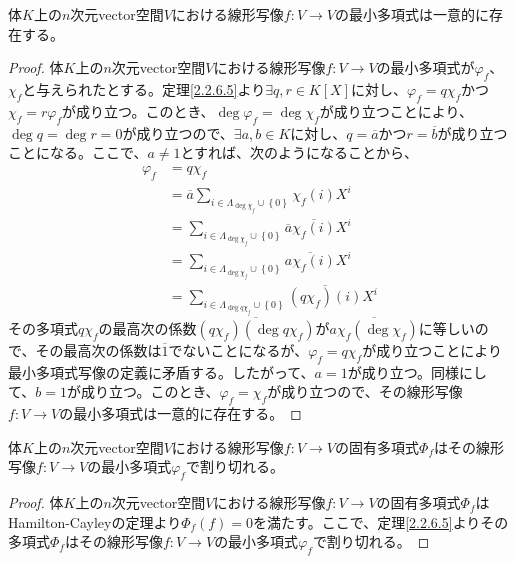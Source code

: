\documentclass[dvipdfmx]{jsarticle}
\begin{document}
\begin{thm}\label{2.2.6.6}
体$K$上の$n$次元vector空間$V$における線形写像$f:V \rightarrow V$の最小多項式は一意的に存在する。
\end{thm}
\begin{proof}
体$K$上の$n$次元vector空間$V$における線形写像$f:V \rightarrow V$の最小多項式が$\varphi_{f}$、$\chi_{f}$と与えられたとする。定理\ref{2.2.6.5}より$\exists q,r \in K[ X]$に対し、$\varphi_{f} = q\chi_{f}$かつ$\chi_{f} = r\varphi_{f}$が成り立つ。このとき、$\deg{\varphi_{f}} = \deg{\chi_{f}}$が成り立つことにより、$\deg{q} = \deg{r} = 0$が成り立つので、$\exists a,b \in K$に対し、$q = \overline{a}$かつ$r = \overline{b}$が成り立つことになる。ここで、$a \neq 1$とすれば、次のようになることから、
\begin{align*}
\varphi_{f} &= q\chi_{f}\\
&= \overline{a}\sum_{i \in \varLambda_{\deg{\chi_{f}}} \cup \left\{ 0 \right\}} {\chi_{f}(i)X^{i}}\\
&= \sum_{i \in \varLambda_{\deg{\chi_{f}}} \cup \left\{ 0 \right\}} {\overline{a}\overline{\chi_{f}(i)}X^{i}}\\
&= \sum_{i \in \varLambda_{\deg{\chi_{f}}} \cup \left\{ 0 \right\}} {\overline{a\chi_{f}(i)}X^{i}}\\
&= \sum_{i \in \varLambda_{\deg{q\chi_{f}}} \cup \left\{ 0 \right\}} {\overline{\left( q\chi_{f} \right)(i)}X^{i}}
\end{align*}
その多項式$q\chi_{f}$の最高次の係数$\overline{\left( q\chi_{f} \right)\left( \deg{q\chi_{f}} \right)}$が$\overline{a\chi_{f}\left( \deg{\chi_{f}} \right)}$に等しいので、その最高次の係数は$\overline{1}$でないことになるが、$\varphi_{f} = q\chi_{f}$が成り立つことにより最小多項式写像の定義に矛盾する。したがって、$a = 1$が成り立つ。同様にして、$b = 1$が成り立つ。このとき、$\varphi_{f} = \chi_{f}$が成り立つので、その線形写像$f:V \rightarrow V$の最小多項式は一意的に存在する。
\end{proof}
\begin{thm}\label{2.2.6.7}
体$K$上の$n$次元vector空間$V$における線形写像$f:V \rightarrow V$の固有多項式$\varPhi_{f}$はその線形写像$f:V \rightarrow V$の最小多項式$\varphi_{f}$で割り切れる。
\end{thm}
\begin{proof}
体$K$上の$n$次元vector空間$V$における線形写像$f:V \rightarrow V$の固有多項式$\varPhi_{f}$はHamilton-Cayleyの定理より$\varPhi_{f}(f) = 0$を満たす。ここで、定理\ref{2.2.6.5}よりその多項式$\varPhi_{f}$はその線形写像$f:V \rightarrow V$の最小多項式$\varphi_{f}$で割り切れる。
\end{proof}
\end{document}
